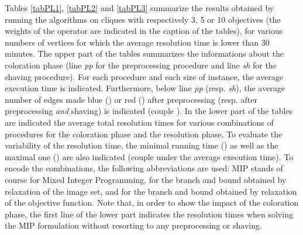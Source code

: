 \documentclass[final,3p,times]{elsarticle}
\begin{document}
Tables \ref{tabPL1}, \ref{tabPL2} and \ref{tabPL3} summarize the results
obtained by running the algorithms on cliques with respectively 3, 5
or 10 objectives (the weights of the  operator are indicated in the caption of the tables), for various numbers of vertices for which the average resolution time is lower than 30 minutes. The upper part of the tables summarizes the informations
about the coloration phase (line \emph{pp} for the preprocessing
procedure and line \emph{sh} for the shaving procedure). For each procedure and each size of instance, the average execution time is indicated. Furthermore, below line \emph{pp} (resp. \emph{sh}), the average number of edges made blue () or red () after preprocessing (resp. after preprocessing \emph{and} shaving) is indicated (couple ). In the lower part of the tables are indicated the average total resolution times for various combinations of procedures for the coloration phase and the resolution phase. To evaluate the variability of the resolution time, the minimal running time () as well as the maximal one () are also indicated (couple  under the average execution time). To encode the combinations, the following abbreviations are used: MIP stands of course for Mixed Integer Programming,   for the branch and bound obtained by relaxation of the image set, and  for the branch and bound obtained by relaxation of the objective function. Note that, in order to show the impact of the coloration phase, the first line of the lower part indicates the resolution times when solving the MIP formulation without resorting to any preprocessing or shaving. 
\end{document}
